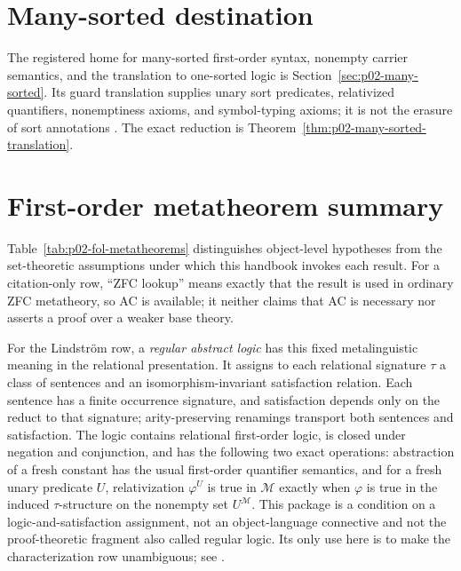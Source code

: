 \section{Many-sorted destination}
\label{sec:p02-first-order-depth-pointers}

The registered home for many-sorted first-order syntax, nonempty carrier
semantics, and the translation to one-sorted logic is
Section~\ref{sec:p02-many-sorted}.  Its guard translation supplies unary sort
predicates, relativized quantifiers, nonemptiness axioms, and symbol-typing
axioms; it is not the erasure of sort annotations \cite{Manzano1996}.  The
exact reduction is Theorem~\ref{thm:p02-many-sorted-translation}.

\section{First-order metatheorem summary}
\label{sec:p02-fol-metatheorem-summary}

Table~\ref{tab:p02-fol-metatheorems} distinguishes object-level hypotheses from
the set-theoretic assumptions under which this handbook invokes each result.
For a citation-only row, ``ZFC lookup'' means exactly that the result is used in
ordinary ZFC metatheory, so AC is available; it neither claims that AC is
necessary nor asserts a proof over a weaker base theory.

For the Lindstr\"om row, a \emph{regular abstract logic}
 has this fixed metalinguistic meaning in the
relational presentation.  It assigns to each relational signature \(\tau\) a
class of sentences and an isomorphism-invariant satisfaction relation.  Each
sentence has a finite occurrence signature, and satisfaction depends only on
the reduct to that signature; arity-preserving renamings transport both
sentences and satisfaction.  The logic contains relational first-order logic,
is closed under negation and conjunction, and has the following two exact
operations: abstraction of a fresh constant has the usual first-order
quantifier semantics, and for a fresh unary predicate \(U\), relativization
\(\varphi^{U}\) is true in \(\mathcal M\) exactly when \(\varphi\) is true in
the induced \(\tau\)-structure on the nonempty set \(U^{\mathcal M}\).  This
package is a condition on a logic-and-satisfaction assignment, not an
object-language connective and not the proof-theoretic fragment also called
regular logic.  Its only use here is to make the characterization row
unambiguous; see \cite[Chapter~XIII, \S1]{EbbinghausFlumThomas1994}.

